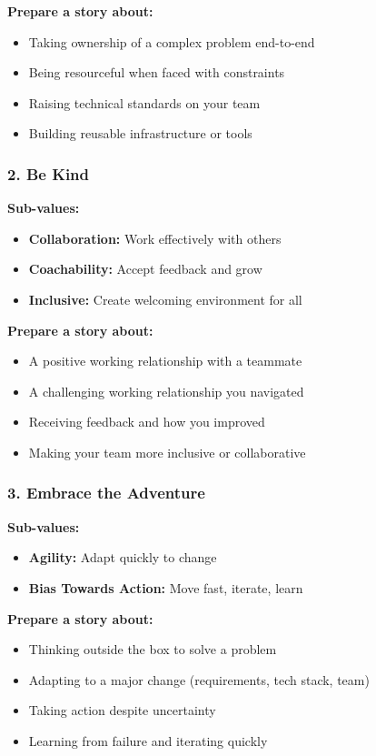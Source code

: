 \documentclass[11pt,letterpaper]{article}
\begin{document}
\textbf{Prepare a story about:}
\begin{itemize}
    \item Taking ownership of a complex problem end-to-end
    \item Being resourceful when faced with constraints
    \item Raising technical standards on your team
    \item Building reusable infrastructure or tools
\end{itemize}

\subsubsection{2. Be Kind}

\textbf{Sub-values:}
\begin{itemize}
    \item \textbf{Collaboration:} Work effectively with others
    \item \textbf{Coachability:} Accept feedback and grow
    \item \textbf{Inclusive:} Create welcoming environment for all
\end{itemize}

\textbf{Prepare a story about:}
\begin{itemize}
    \item A positive working relationship with a teammate
    \item A challenging working relationship you navigated
    \item Receiving feedback and how you improved
    \item Making your team more inclusive or collaborative
\end{itemize}

\subsubsection{3. Embrace the Adventure}

\textbf{Sub-values:}
\begin{itemize}
    \item \textbf{Agility:} Adapt quickly to change
    \item \textbf{Bias Towards Action:} Move fast, iterate, learn
\end{itemize}

\textbf{Prepare a story about:}
\begin{itemize}
    \item Thinking outside the box to solve a problem
    \item Adapting to a major change (requirements, tech stack, team)
    \item Taking action despite uncertainty
    \item Learning from failure and iterating quickly
\end{itemize}
\end{document}
